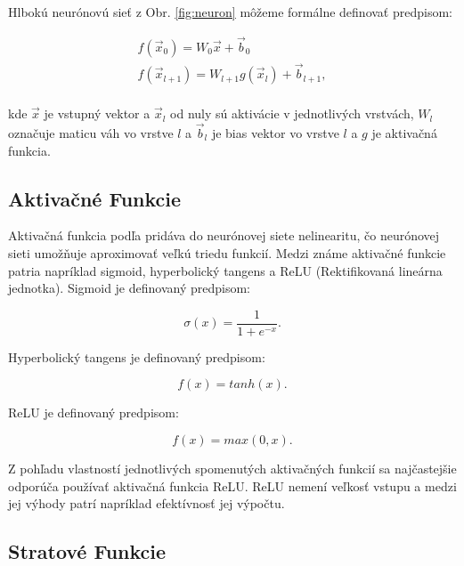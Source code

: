 Hlbokú neurónovú sieť z Obr. \ref{fig:neuron} môžeme formálne definovať predpisom:

\begin{equation}
\begin{split}
  f(\vec{x}_0) = W_0 \vec{x} + \vec{b}_0 \\
  f(\vec{x}_{l+1}) = W_{l+1} g(\vec{x}_l) + \vec{b}_{l+1}, \\  
\end{split}
\end{equation}

\noindent kde $\vec{x}$ je vstupný vektor a $\vec{x}_l$ od nuly sú aktivácie v jednotlivých vrstvách, $W_l$ označuje maticu váh vo vrstve $l$ a $\vec{b}_l$ je bias vektor vo vrstve $l$ a $g$ je aktivačná funkcia.

\subsection{Aktivačné Funkcie} \label{sec:aktivacne_funkcie}

Aktivačná funkcia podľa \cite{Goodfellow-et-al-2016} pridáva do neurónovej siete nelinearitu, čo neurónovej sieti umožňuje aproximovať veľkú triedu funkcií. Medzi známe aktivačné funkcie patria napríklad sigmoid, hyperbolický tangens a ReLU (Rektifikovaná lineárna jednotka). Sigmoid je definovaný predpisom:

\begin{equation}
\sigma(x) = \frac{1}{1 + e^{-x}}.
\end{equation}

Hyperbolický tangens je definovaný predpisom:

\begin{equation}
f(x) = tanh(x).
\end{equation}

ReLU je definovaný predpisom:

\begin{equation}
f(x) = max(0, x).
\end{equation}

Z pohľadu vlastností jednotlivých spomenutých aktivačných funkcií sa najčastejšie odporúča používať aktivačná funkcia ReLU. ReLU nemení veľkosť vstupu a medzi jej výhody patrí napríklad efektívnosť jej výpočtu.

\subsection{Stratové Funkcie} \label{sec:stratove_funkcie}

